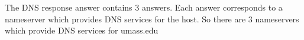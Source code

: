 The DNS response answer contains 3 answers. Each answer corresponds to a nameserver which provides DNS services for the host. So there are 3 nameservers which provide DNS services for umass.edu